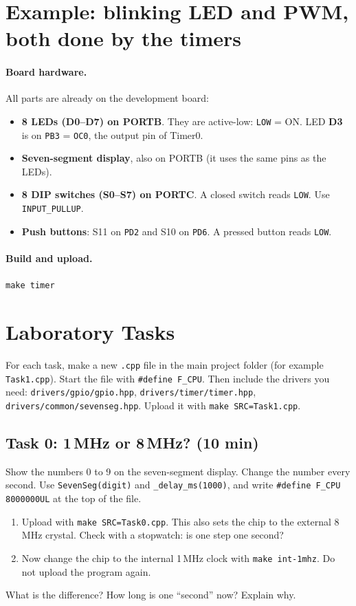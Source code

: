 \documentclass[11pt,a4paper]{article}
\newcommand{\code}[1]{\texttt{#1}}
\begin{document}
\newpage
\section{Example: blinking LED and PWM, both done by the timers}

\paragraph{Board hardware.} All parts are already on the development board:
\begin{itemize}
  \item \textbf{8 LEDs (D0--D7) on PORTB}. They are active-low: \code{LOW} = ON. LED \textbf{D3} is on \code{PB3} = \code{OC0}, the output pin of Timer0.
  \item \textbf{Seven-segment display}, also on PORTB (it uses the same pins as the LEDs).
  \item \textbf{8 DIP switches (S0--S7) on PORTC}. A closed switch reads \code{LOW}. Use \code{INPUT\_PULLUP}.
  \item \textbf{Push buttons}: S11 on \code{PD2} and S10 on \code{PD6}. A pressed button reads \code{LOW}.
\end{itemize}

\paragraph{Build and upload.} \code{make timer}



\newpage
\section{Laboratory Tasks}
\setlength{\parindent}{0pt}\setlength{\parskip}{5pt}

For each task, make a new \code{.cpp} file in the main project folder (for
example \code{Task1.cpp}). Start the file with \code{\#define F\_CPU}. Then
include the drivers you need: \code{drivers/gpio/gpio.hpp},
\code{drivers/timer/timer.hpp}, \code{drivers/common/sevenseg.hpp}. Upload it
with \code{make SRC=Task1.cpp}.

\subsection*{Task 0: 1\,MHz or 8\,MHz? (10 min)}
Show the numbers 0 to 9 on the seven-segment display. Change the number every
second. Use \code{SevenSeg(digit)} and \code{\_delay\_ms(1000)}, and write
\code{\#define F\_CPU 8000000UL} at the top of the file.
\begin{enumerate}
  \item Upload with \code{make SRC=Task0.cpp}. This also sets the chip to the
        external 8\,MHz crystal. Check with a stopwatch: is one step one second?
  \item Now change the chip to the internal 1\,MHz clock with
        \code{make int-1mhz}. Do not upload the program again.
\end{enumerate}
What is the difference? How long is one ``second'' now? Explain why.
\end{document}

